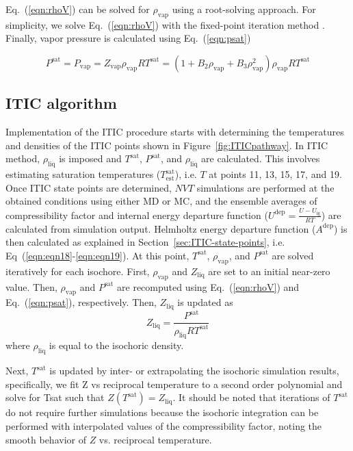 \documentclass[5p,times]{elsarticle}
\begin{document}
Eq.~(\ref{eqn:rhoV}) can be solved for $\rho_\mathrm{vap}$ using a root-solving approach. For simplicity, we solve Eq.~(\ref{eqn:rhoV}) with the fixed-point iteration method \cite{Burden1985}. Finally, vapor pressure is calculated using Eq.~(\ref{eqn:psat})

\begin{equation}
P^\mathrm{sat} = P_\mathrm{vap} = {Z_\mathrm{vap}}{\rho _\mathrm{vap}}RT^\mathrm{sat} = (1 + {B_2} {\rho_\mathrm{vap}} + {B_3}\rho _\mathrm{vap}^2){\rho _\mathrm{vap}}RT^\mathrm{sat} 
\label{eqn:psat}
\end{equation}



\subsection{ITIC algorithm}
Implementation of the ITIC procedure starts with determining the temperatures and densities of the ITIC points shown in Figure~\ref{fig:ITICpathway}. In ITIC method, $\rho_\mathrm{liq}$ is imposed and $T^\mathrm{sat}$, $P^\mathrm{sat}$, and $\rho_\mathrm{liq}$ are calculated. This involves estimating saturation temperatures ($T^\mathrm{sat}_\mathrm{est}$), i.e. $T$ at points 11, 13, 15, 17, and 19. Once ITIC state points are determined, $NVT$ simulations are performed at the obtained conditions using either MD or MC, and the ensemble averages of compressibility factor and internal energy departure function ($U^\mathrm{dep}=\frac{U-U_\mathrm{ig}}{RT}$) are calculated from simulation output. Helmholtz energy departure function ($A^\mathrm{dep}$) is then calculated as explained in Section~\ref{sec:ITIC-state-points}, i.e. Eq~(\ref{eqn:eqn18}-\ref{eqn:eqn19}). At this point, $T^\mathrm{sat}$, $\rho_\mathrm{vap}$, and $P^\mathrm{sat}$ are solved iteratively for each isochore. First, $\rho_\mathrm{vap}$ and $Z_\mathrm{liq}$ are set to an initial near-zero value. Then, $\rho_\mathrm{vap}$ and $P^\mathrm{sat}$ are recomputed using Eq.~(\ref{eqn:rhoV}) and Eq.~(\ref{eqn:psat}), respectively. Then, $Z_\mathrm{liq}$ is updated as 
\begin{equation}
{Z_{\mathrm{liq}}} = \frac{P^\mathrm{sat}}{\rho_\mathrm{liq}RT^\mathrm{sat}}  
\label{eqn:zliq}
\end{equation}
where $\rho_\mathrm{liq}$ is equal to the isochoric density.

Next, $T^\mathrm{sat}$ is updated by inter- or extrapolating the isochoric simulation results, specifically, we fit Z vs reciprocal temperature to a second order polynomial and solve for Tsat such that $Z(T^\mathrm{sat})=Z_\mathrm{liq}$. It should be noted that iterations of $T^\mathrm{sat}$ do not require further simulations because the isochoric integration can be performed with interpolated values of the compressibility factor, noting the smooth behavior of $Z$ vs. reciprocal temperature.
\end{document}
